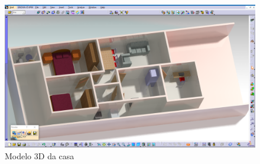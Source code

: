 \begin{figure}[!ht]
\caption{Modelo 3D da casa}
\includegraphics[width=\textwidth]{figuras/modelo3D}
\end{figure}

\FloatBarrier
